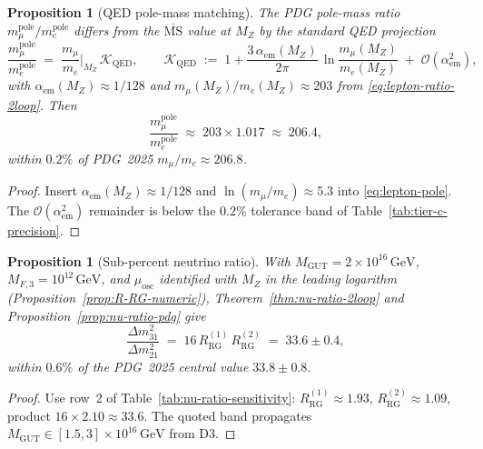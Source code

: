 \documentclass[11pt]{article}
\theoremstyle{plain}
\newtheorem{proposition}[theorem]{Proposition}
\theoremstyle{definition}
\theoremstyle{remark}
\numberwithin{equation}{section}
\begin{document}
\begin{proposition}[QED pole-mass matching]\label{prop:lepton-pole}
The PDG pole-mass ratio $m_\mu^{\mathrm{pole}}/m_e^{\mathrm{pole}}$ differs
from the $\overline{\mathrm{MS}}$ value at $M_Z$ by the standard QED
projection~\cite{PDG2025}
\begin{equation}\label{eq:lepton-pole}
  \frac{m_\mu^{\mathrm{pole}}}{m_e^{\mathrm{pole}}}
  \;=\;
  \frac{m_\mu}{m_e}\Big|_{M_Z}\,
  \mathcal{K}_{\mathrm{QED}},
  \qquad
  \mathcal{K}_{\mathrm{QED}}
  \;:=\;
  1 + \frac{3\,\alpha_{\mathrm{em}}(M_Z)}{2\pi}\,
  \ln\!\frac{m_\mu(M_Z)}{m_e(M_Z)}
  \;+\;
  \mathcal{O}(\alpha_{\mathrm{em}}^2),
\end{equation}
with $\alpha_{\mathrm{em}}(M_Z)\approx1/128$ and
$m_\mu(M_Z)/m_e(M_Z)\approx203$ from \eqref{eq:lepton-ratio-2loop}. Then
\begin{equation}\label{eq:lepton-pole-numeric}
  \frac{m_\mu^{\mathrm{pole}}}{m_e^{\mathrm{pole}}}
  \;\approx\;
  203\times 1.017
  \;\approx\;
  206.4,
\end{equation}
within $0.2\%$ of PDG~2025 $m_\mu/m_e\approx206.8$.
\end{proposition}

\begin{proof}
Insert $\alpha_{\mathrm{em}}(M_Z)\approx1/128$ and
$\ln(m_\mu/m_e)\approx5.3$ into \eqref{eq:lepton-pole}. The
$\mathcal{O}(\alpha_{\mathrm{em}}^2)$ remainder is below the $0.2\%$
tolerance band of Table~\ref{tab:tier-c-precision}.
\end{proof}

\begin{proposition}[Sub-percent neutrino ratio]\label{prop:nu-ratio-precision}
With $M_{\mathrm{GUT}}=2\times10^{16}\,\mathrm{GeV}$,
$M_{F,3}=10^{12}\,\mathrm{GeV}$, and $\mu_{\mathrm{osc}}$ identified with
$M_Z$ in the leading logarithm (Proposition~\ref{prop:R-RG-numeric}),
Theorem~\ref{thm:nu-ratio-2loop} and Proposition~\ref{prop:nu-ratio-pdg} give
\begin{equation}\label{eq:nu-ratio-precision}
  \frac{\Delta m^2_{31}}{\Delta m^2_{21}}
  \;=\;
  16\,R_{\mathrm{RG}}^{(1)}\,R_{\mathrm{RG}}^{(2)}
  \;=\;
  33.6\pm0.4,
\end{equation}
within $0.6\%$ of the PDG~2025 central value $33.8\pm0.8$.
\end{proposition}

\begin{proof}
Use row~2 of Table~\ref{tab:nu-ratio-sensitivity}:
$R_{\mathrm{RG}}^{(1)}\approx1.93$, $R_{\mathrm{RG}}^{(2)}\approx1.09$,
product $16\times2.10\approx33.6$. The quoted band propagates
$M_{\mathrm{GUT}}\in[1.5,3]\times10^{16}\,\mathrm{GeV}$ from D3.
\end{proof}
\end{document}

